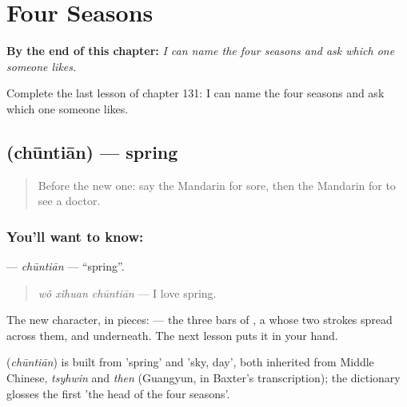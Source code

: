 
\chapter{Four Seasons}
\label{ch:zh-four-seasons}

\begin{chapteropening}
\textbf{By the end of this chapter:} \emph{I can name the four seasons and ask which one someone likes.}

Complete the last lesson of chapter 131: I can name the four seasons and ask which one someone likes.
\end{chapteropening}

\section[\texorpdfstring{\zh{春天} (chūntiān)}{春天 (chūntiān)}]{ (chūntiān) — spring}

\label{lesson:ZH-C131-chuntian}



\begin{quote}
Before the new one: say the Mandarin for sore, then the Mandarin for to see a doctor.
\end{quote}

\subsection*{You'll want to know: }
\textbf{} — \emph{chūntiān} — \textquotedblleft{}spring\textquotedblright{}.

\begin{quote}
\textbf{} \emph{wǒ xǐhuan chūntiān} — I love spring.
\end{quote}

The new character, in pieces:  — the three bars of , a  whose two strokes spread across them, and  underneath. The next lesson puts it in your hand.

\begin{cousinweb}
\textbf{} (\emph{chūntiān}) is built from  'spring' and  'sky, day', both inherited from Middle Chinese, \emph{tsyhwin} and \emph{then} (Guangyun, in Baxter's transcription); the dictionary glosses the first 'the head of the four seasons'.
\end{cousinweb}

